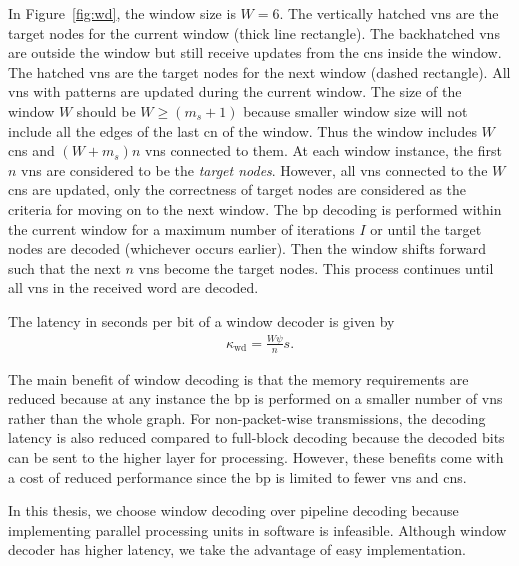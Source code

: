 In Figure~\ref{fig:wd}, the window size is $W=6$. The vertically hatched \acp{vn} are the target nodes for the current window (thick line rectangle). The backhatched \acp{vn} are outside the window but still receive updates from the \acp{cn} inside the window. The hatched \acp{vn} are the target nodes for the next window (dashed rectangle). All \acp{vn} with patterns are updated during the current window. The size of the window $W$ should be $W\geq (m_s+1)$ because smaller window size will not include all the edges of the last \ac{cn} of the window. Thus the window includes $W$ \acp{cn} and $(W+m_s)n$ \acp{vn} connected to them. At each window instance, the first $n$ \acp{vn} are considered to be the \emph{target nodes}. However, all \acp{vn} connected to the $W$ \acp{cn} are updated, only the correctness of target nodes are considered as the criteria for moving on to the next window. The \ac{bp} decoding is performed within the current window for a maximum number of iterations $I$ or until the target nodes are decoded (whichever occurs earlier). Then the window shifts forward such that the next $n$ \acp{vn} become the target nodes. This process continues until all \acp{vn} in the received word are decoded.

The latency in seconds per bit of a window decoder is given by
\begin{align}
\kappa_{\text{wd}}=\frac{W\psi}{n}s.
\end{align}

The main benefit of window decoding is that the memory requirements are reduced because at any instance the \ac{bp} is performed on a smaller number of \acp{vn} rather than the whole graph. For non-packet-wise transmissions, the decoding latency is also reduced compared to full-block decoding because the decoded bits can be sent to the higher layer for processing. However, these benefits come with a cost of reduced performance since the \ac{bp} is limited to fewer \acp{vn} and \acp{cn}.

In this thesis, we choose window decoding over pipeline decoding because implementing parallel processing units in software is infeasible. Although window decoder has higher latency, we take the advantage of easy implementation.


